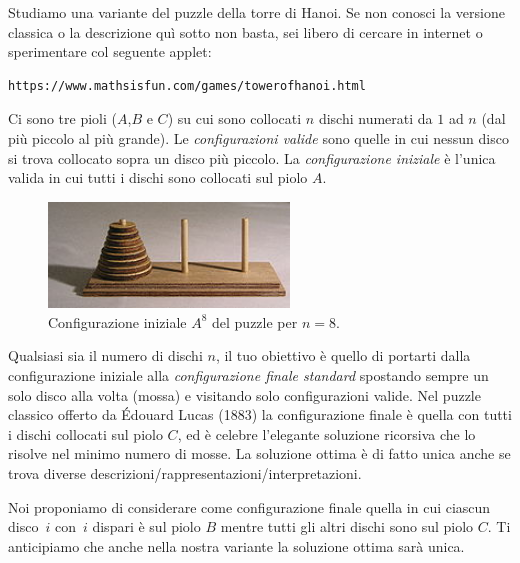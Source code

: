 \renewcommand{\nomebreve}{hanoi\_split}
\renewcommand{\titolo}{Split even and odd disks of an Hanoi tower\\}

\introduzione{}

Studiamo una variante del puzzle della torre di Hanoi. Se non conosci la versione classica o la descrizione quì sotto non basta, sei libero di cercare in internet o sperimentare col seguente applet:

\begin{verbatim}
https://www.mathsisfun.com/games/towerofhanoi.html
\end{verbatim}

Ci sono tre pioli ($A$,$B$ e $C$) su cui sono collocati $n$ dischi numerati da $1$ ad $n$ (dal più piccolo al più grande). Le \emph{configurazioni valide} sono quelle in cui nessun disco si trova collocato sopra un disco più piccolo.
La \emph{configurazione iniziale} è l'unica valida in cui tutti i dischi sono collocati sul piolo $A$.

\begin{figure}[h!]
\begin{center}
  \noindent \includegraphics[width=0.57\textwidth]{figures/220px-Tower_of_Hanoi.jpeg}
\end{center}
\caption{Configurazione iniziale $A^8$ del puzzle per $n=8$.}
\end{figure}

Qualsiasi sia il numero di dischi $n$, il tuo obiettivo è quello di portarti dalla configurazione iniziale alla \emph{configurazione finale standard} spostando sempre un solo disco alla volta (mossa) e visitando solo configurazioni valide.
Nel puzzle classico offerto da Édouard Lucas (1883) la configurazione finale è quella con tutti i dischi collocati sul piolo $C$, ed è celebre l'elegante soluzione ricorsiva che lo risolve nel minimo numero di mosse. La soluzione ottima è di fatto unica anche se trova diverse descrizioni/rappresentazioni/interpretazioni.

Noi proponiamo di considerare come configurazione finale quella in cui ciascun disco~$i$ con~$i$ dispari è sul piolo $B$ mentre tutti gli altri dischi sono sul piolo $C$. Ti anticipiamo che anche nella nostra variante la soluzione ottima sarà unica.\\

